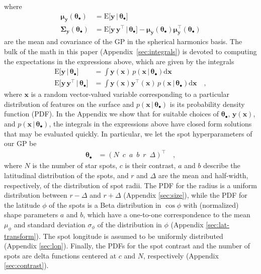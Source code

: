 \documentclass[modern]{aastex62}
\begin{document}
%
where
%
\begin{align}
    \label{eq:mean_y}
    \pmb{\mu}_{\mathbf{y}}(\pmb{\theta}_\bullet)
     & = \mathrm{E} \Big[ \mathbf{y} \, \Big| \, \pmb{\theta}_\bullet \Big]
    \\
    \label{eq:cov_y}
    \pmb{\Sigma}_{\mathbf{y}}(\pmb{\theta}_\bullet)
     & = \mathrm{E} \Big[ \mathbf{y} \, \mathbf{y}^\top \, \Big| \, \pmb{\theta}_\bullet \Big] - \pmb{\mu}_{\mathbf{y}}(\pmb{\theta}_\bullet) \pmb{\mu}_{\mathbf{y}}^\top(\pmb{\theta}_\bullet)
\end{align}
%
are the mean and covariance of the GP in the spherical harmonics basis.
The bulk of the math in this paper (Appendix~\ref{sec:integrals})
is devoted to computing
the expectations in the expressions above, which
are given by the integrals
%
\begin{align}
    \label{eq:exp_y}
    \mathrm{E} \Big[ \mathbf{y} \, \Big| \, \pmb{\theta}_\bullet \Big]
     & =
    \int \mathbf{y}(\mathbf{x} ) \, p(\mathbf{x} \, \big| \, \pmb{\theta}_\bullet)\mathrm{d}\mathbf{x}
    \\
    \label{eq:exp_yy}
    \mathrm{E} \Big[ \mathbf{y} \, \mathbf{y}^\top \, \Big| \, \pmb{\theta}_\bullet \Big]
     & =
    \int \mathbf{y}(\mathbf{x} ) \mathbf{y}^\top(\mathbf{x} ) \, p(\mathbf{x} \, \big| \, \pmb{\theta}_\bullet)\mathrm{d}\mathbf{x}
    \quad,
\end{align}
%
where $\mathbf{x}$ is a random vector-valued variable corresponding to a particular
distribution of features on the surface
and $p(\mathbf{x} \, \big| \, \pmb{\theta}_\bullet)$ is its probability density
function (PDF).
%
In the Appendix we show that for suitable choices of $\pmb{\theta}_\bullet$,
$\mathbf{y}(\mathbf{x})$,
and $p(\mathbf{x} \, \big| \, \pmb{\theta}_\bullet)$, the integrals in the expressions
above have closed form solutions that may be evaluated quickly.
%
In particular, we let the spot hyperparameters of our GP be
%
\begin{align}
    \label{eq:thetaspot}
    \pmb{\theta}_\bullet
     & =
    \left(
    N
    \,\,\,
    c
    \,\,\,
    a
    \,\,\,
    b
    \,\,\,
    r
    \,\,\,
    \Delta
    \right)^\top
    \quad,
\end{align}
%
where $N$ is the number of star spots, $c$ is their contrast,
$a$ and $b$ describe the latitudinal
distribution of the spots, and $r$ and $\Delta$ are the mean and
half-width, respectively, of the distribution of spot radii.
%
The PDF for the radius is a uniform distribution
between $r - \Delta$ and $r + \Delta$ (Appendix \ref{sec:size}),
while
the PDF for the latitude $\phi$ of the spots is a Beta distribution in
$\cos\phi$ with (normalized) shape parameters $a$ and $b$,
which have a one-to-one correspondence to the mean $\mu_\phi$ and
standard deviation $\sigma_\phi$ of the distribution in $\phi$
(Appendix \ref{sec:lat-transform}).
The spot longitude is assumed to be uniformly distributed
(Appendix \ref{sec:lon}). Finally,
the PDFs for the spot contrast and the number of spots are delta functions
centered at $c$ and $N$, respectively (Appendix \ref{sec:contrast}).
\end{document}
